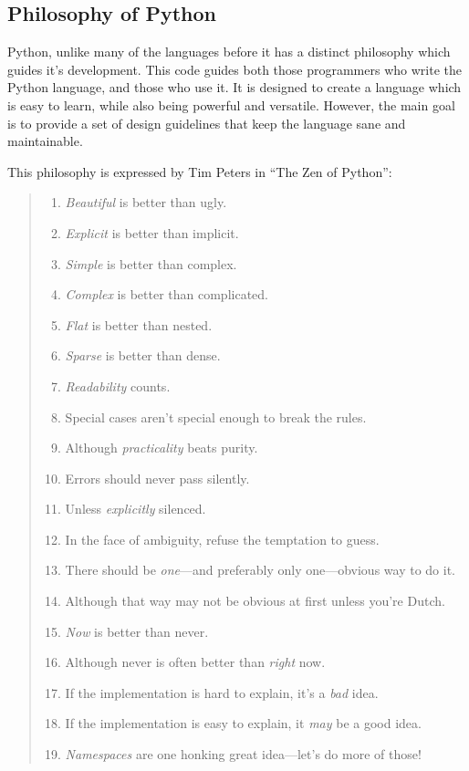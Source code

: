 		\subsection{Philosophy of Python}
			Python, unlike many of the languages before it has a distinct philosophy which guides it's development. 
			This code guides both those programmers who write the Python language, and those who use it. 
			It is designed to create a language which is easy to learn, while also being powerful and versatile. 
			However, the main goal is to provide a set of design guidelines that keep the language sane and maintainable. 

			This philosophy is expressed by Tim Peters in ``The Zen of Python''\cite{ZenOfPython}:
			\begin{quote}
				\begin{enumerate}
					\item \emph{Beautiful} is better than ugly.
					\item \emph{Explicit} is better than implicit.
					\item \emph{Simple} is better than complex.
					\item \emph{Complex} is better than complicated.
					\item \emph{Flat} is better than nested.
					\item \emph{Sparse} is better than dense.
					\item \emph{Readability} counts.
					\item Special cases aren't special enough to break the rules.
					\item Although \emph{practicality} beats purity.
					\item Errors should never pass silently.
					\item Unless \emph{explicitly} silenced.
					\item In the face of ambiguity, refuse the temptation to guess.
					\item There should be \emph{one}---and preferably only one---obvious way to do it.
					\item Although that way may not be obvious at first unless you're Dutch.
					\item \emph{Now} is better than never.
					\item Although never is often better than \emph{right} now.
					\item If the implementation is hard to explain, it's a \emph{bad} idea.
					\item If the implementation is easy to explain, it \emph{may} be a good idea.
					\item \emph{Namespaces} are one honking great idea---let's do more of those!
				\end{enumerate}
			\end{quote}
